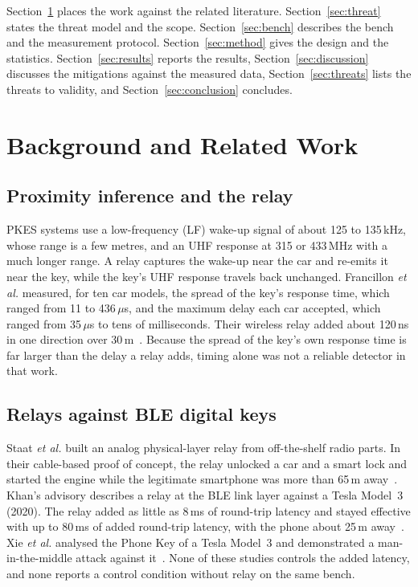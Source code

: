 \documentclass{ieeeaccess}
\begin{document}
Section~\ref{sec:background} places the work against the related literature. Section~\ref{sec:threat} states the threat model and the scope. Section~\ref{sec:bench} describes the bench and the measurement protocol. Section~\ref{sec:method} gives the design and the statistics. Section~\ref{sec:results} reports the results, Section~\ref{sec:discussion} discusses the mitigations against the measured data, Section~\ref{sec:threats} lists the threats to validity, and Section~\ref{sec:conclusion} concludes.

\section{Background and Related Work}
\label{sec:background}

\subsection{Proximity inference and the relay}

PKES systems use a low-frequency (LF) wake-up signal of about 125 to 135\,kHz, whose range is a few metres, and an UHF response at 315 or 433\,MHz with a much longer range. A relay captures the wake-up near the car and re-emits it near the key, while the key's UHF response travels back unchanged. Francillon \emph{et al.} measured, for ten car models, the spread of the key's response time, which ranged from 11 to 436\,$\mu$s, and the maximum delay each car accepted, which ranged from 35\,$\mu$s to tens of milliseconds. Their wireless relay added about 120\,ns in one direction over 30\,m~\cite{b1}. Because the spread of the key's own response time is far larger than the delay a relay adds, timing alone was not a reliable detector in that work.

\subsection{Relays against BLE digital keys}

Staat \emph{et al.} built an analog physical-layer relay from off-the-shelf radio parts. In their cable-based proof of concept, the relay unlocked a car and a smart lock and started the engine while the legitimate smartphone was more than 65\,m away~\cite{b3}. Khan's advisory describes a relay at the BLE link layer against a Tesla Model~3 (2020). The relay added as little as 8\,ms of round-trip latency and stayed effective with up to 80\,ms of added round-trip latency, with the phone about 25\,m away~\cite{b4}. Xie \emph{et al.} analysed the Phone Key of a Tesla Model~3 and demonstrated a man-in-the-middle attack against it~\cite{b25}. None of these studies controls the added latency, and none reports a control condition without relay on the same bench.
\end{document}

